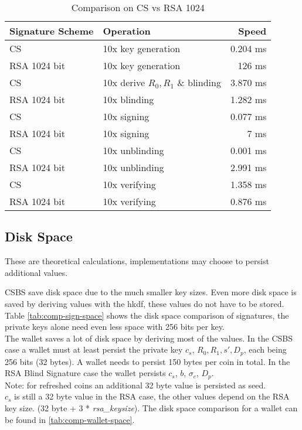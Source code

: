 \begin{table}[h]
    \centering
    \setupBfhTabular
    \begin{tabular}{llr}
        \rowcolor{BFH-tablehead}
        \textbf{Signature Scheme} & \textbf{Operation} & \textbf{Speed} \\\hline
        CS & 10x key generation & 0.204 ms \\\hline
        RSA 1024 bit & 10x key generation & 126 ms \\\hline
        \hline
        CS & 10x derive $R_0, R_1$ \& blinding  & 3.870 ms \\\hline
        RSA 1024 bit & 10x blinding & 1.282 ms \\\hline
        \hline
        CS & 10x signing & 0.077 ms \\\hline
        RSA 1024 bit & 10x signing & 7 ms \\\hline
        \hline
        CS & 10x unblinding & 0.001 ms \\\hline
        RSA 1024 bit & 10x unblinding & 2.991 ms \\\hline
        \hline
        CS & 10x verifying & 1.358 ms \\\hline
        RSA 1024 bit & 10x verifying & 0.876 ms \\\hline
    \end{tabular}
    \caption{Comparison on CS vs RSA 1024}
    \label{tab:comp-cs-vs-rsa-1024}
\end{table}
\subsection{Disk Space}
\begin{bfhWarnBox}
    These are theoretical calculations, implementations may choose to persist additional values.
  \end{bfhWarnBox}
\gls{CSBS} save disk space due to the much smaller key sizes.
Even more disk space is saved by deriving values with the \gls{hkdf}, these values do not have to be stored.
\\
Table \ref{tab:comp-sign-space} shows the disk space comparison of signatures, the private keys alone need even less space with 256 bits per key.
\\
The wallet saves a lot of disk space by deriving most of the values.
In the \gls{CSBS} case a wallet must at least persist the private key $c_s$, $R_0, R_1, s', D_p$, each being 256 bits (32 bytes).
A wallet needs to persist 150 bytes per coin in total.
In the RSA Blind Signature case the wallet persists $c_s$, $b$, $\sigma_c$, $D_p$.
\\Note: for refreshed coins an additional 32 byte value is persisted as seed.\\
$c_s$ is still a 32 byte value in the RSA case, the other values depend on the RSA key size. (32 byte + 3 * \textit{rsa\_keysize}).
The disk space comparison for a wallet can be found in \ref{tab:comp-wallet-space}.

